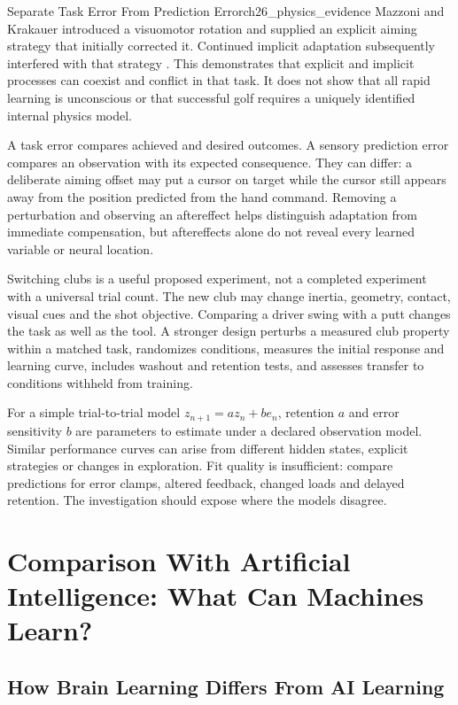 \begin{example}{Separate Task Error From Prediction Error}{ch26_physics_evidence}
Mazzoni and Krakauer introduced a visuomotor rotation and supplied an explicit aiming strategy that initially corrected it. Continued implicit adaptation subsequently interfered with that strategy \citep{Mazzoni2006Strategy}. This demonstrates that explicit and implicit processes can coexist and conflict in that task. It does not show that all rapid learning is unconscious or that successful golf requires a uniquely identified internal physics model.
\end{example}

A task error compares achieved and desired outcomes. A sensory prediction error compares an observation with its expected consequence. They can differ: a deliberate aiming offset may put a cursor on target while the cursor still appears away from the position predicted from the hand command. Removing a perturbation and observing an aftereffect helps distinguish adaptation from immediate compensation, but aftereffects alone do not reveal every learned variable or neural location.

Switching clubs is a useful proposed experiment, not a completed experiment with a universal trial count. The new club may change inertia, geometry, contact, visual cues and the shot objective. Comparing a driver swing with a putt changes the task as well as the tool. A stronger design perturbs a measured club property within a matched task, randomizes conditions, measures the initial response and learning curve, includes washout and retention tests, and assesses transfer to conditions withheld from training.

For a simple trial-to-trial model $z_{n+1}=az_n+be_n$, retention $a$ and error sensitivity $b$ are parameters to estimate under a declared observation model. Similar performance curves can arise from different hidden states, explicit strategies or changes in exploration. Fit quality is insufficient: compare predictions for error clamps, altered feedback, changed loads and delayed retention. The investigation should expose where the models disagree.

\section{Comparison With Artificial Intelligence: What Can Machines Learn?}
\label{sec:ch26_brain_vs_ai}

\subsection{How Brain Learning Differs From AI Learning}
\label{subsec:ch26_brain_vs_ai_learning}

